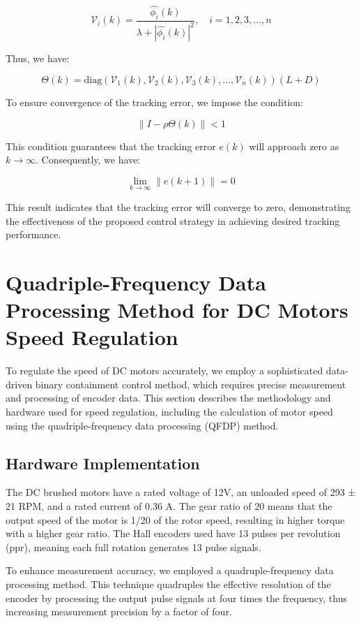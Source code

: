 \documentclass[journal,onecolumn]{IEEEtran}
\begin{document}
\[
\mathcal{V}_i(k) = \frac{\hat{\phi_i}(k)}{\lambda + |\hat{\phi_i}(k)|^2}, \quad i = 1, 2, 3, \dots, n
\]

Thus, we have:

\[
\Theta(k) = \text{diag}(\mathcal{V}_1(k), \mathcal{V}_2(k), \mathcal{V}_3(k), \dots, \mathcal{V}_n(k)) (L + D)
\]

To ensure convergence of the tracking error, we impose the condition:

\begin{equation}
    \label{model 36}
    \|I - \rho \Theta(k)\| < 1
\end{equation}

This condition guarantees that the tracking error \(e(k)\) will approach zero as \(k \to \infty\). Consequently, we have:

\[
\lim_{k \to \infty} \|e(k+1)\| = 0
\]

This result indicates that the tracking error will converge to zero, demonstrating the effectiveness of the proposed control strategy in achieving desired tracking performance.

\section{Quadriple-Frequency Data Processing Method for DC Motors Speed Regulation}

To regulate the speed of DC motors accurately, we employ a sophisticated data-driven binary containment control method, which requires precise measurement and processing of encoder data. This section describes the methodology and hardware used for speed regulation, including the calculation of motor speed using the quadriple-frequency data processing (QFDP) method.

\subsection{Hardware Implementation}

The DC brushed motors have a rated voltage of 12V, an unloaded speed of 293 ± 21 RPM, and a rated current of 0.36 A. The gear ratio of 20 means that the output speed of the motor is 1/20 of the rotor speed, resulting in higher torque with a higher gear ratio. The Hall encoders used have 13 pulses per revolution (ppr), meaning each full rotation generates 13 pulse signals. 

To enhance measurement accuracy, we employed a quadruple-frequency data processing method. This technique quadruples the effective resolution of the encoder by processing the output pulse signals at four times the frequency, thus increasing measurement precision by a factor of four.
\end{document}
